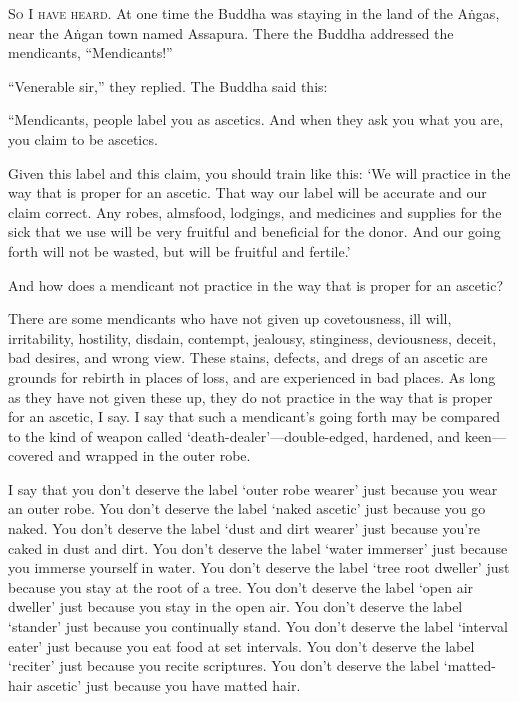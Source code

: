 \documentclass[12pt,openany]{book}%
\newcommand*{\scevam}[1]{\textsc{#1}}
\begin{document}
\scevam{So I have heard. }At one time the Buddha was staying in the land of the \textsanskrit{Aṅgas}, near the \textsanskrit{Aṅgan} town named Assapura. There the Buddha addressed the mendicants, “Mendicants!” 

“Venerable sir,” they replied. The Buddha said this: 

“Mendicants, people label you as ascetics. And when they ask you what you are, you claim to be ascetics. 

Given this label and this claim, you should train like this: ‘We will practice in the way that is proper for an ascetic. That way our label will be accurate and our claim correct. Any robes, almsfood, lodgings, and medicines and supplies for the sick that we use will be very fruitful and beneficial for the donor. And our going forth will not be wasted, but will be fruitful and fertile.’ 

And how does a mendicant not practice in the way that is proper for an ascetic? 

There are some mendicants who have not given up covetousness, ill will, irritability, hostility, disdain, contempt, jealousy, stinginess, deviousness, deceit, bad desires, and wrong view. These stains, defects, and dregs of an ascetic are grounds for rebirth in places of loss, and are experienced in bad places. As long as they have not given these up, they do not practice in the way that is proper for an ascetic, I say. I say that such a mendicant’s going forth may be compared to the kind of weapon called ‘death-dealer’—double-edged, hardened, and keen—covered and wrapped in the outer robe. 

I say that you don’t deserve the label ‘outer robe wearer’ just because you wear an outer robe. You don’t deserve the label ‘naked ascetic’ just because you go naked. You don’t deserve the label ‘dust and dirt wearer’ just because you’re caked in dust and dirt. You don’t deserve the label ‘water immerser’ just because you immerse yourself in water. You don’t deserve the label ‘tree root dweller’ just because you stay at the root of a tree. You don’t deserve the label ‘open air dweller’ just because you stay in the open air. You don’t deserve the label ‘stander’ just because you continually stand. You don’t deserve the label ‘interval eater’ just because you eat food at set intervals. You don’t deserve the label ‘reciter’ just because you recite scriptures. You don’t deserve the label ‘matted-hair ascetic’ just because you have matted hair. 
\end{document}
